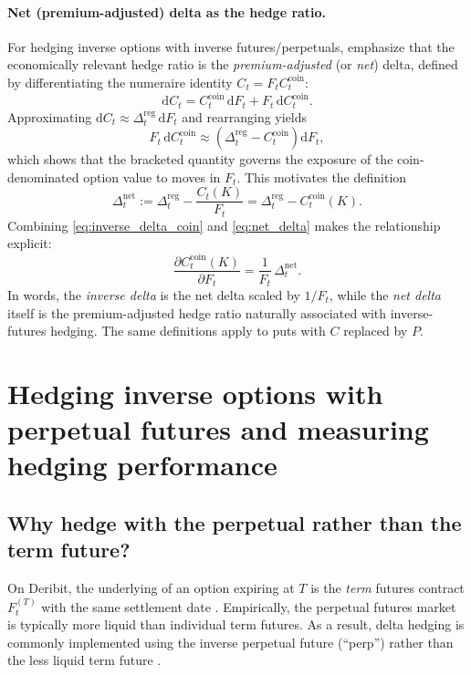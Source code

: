 \documentclass[a4paper,titlepage,12pt]{report}
\theoremstyle{plain}
\begin{document}
\paragraph{Net (premium-adjusted) delta as the hedge ratio.}
For hedging inverse options with inverse futures/perpetuals, \citet{LucicSepp2024} emphasize that the
economically relevant hedge ratio is the \emph{premium-adjusted} (or \emph{net}) delta, defined by
differentiating the numeraire identity $C_t = F_t C_t^{\mathrm{coin}}$:
\[
\mathrm{d}C_t
=
C_t^{\mathrm{coin}}\,\mathrm{d}F_t
+
F_t\,\mathrm{d}C_t^{\mathrm{coin}}.
\]
Approximating $\mathrm{d}C_t \approx \Delta_t^{\mathrm{reg}}\,\mathrm{d}F_t$ and rearranging yields
\[
F_t\,\mathrm{d}C_t^{\mathrm{coin}}
\approx
\left(\Delta_t^{\mathrm{reg}}-C_t^{\mathrm{coin}}\right)\mathrm{d}F_t,
\]
which shows that the bracketed quantity governs the exposure of the coin-denominated option value to
moves in $F_t$. This motivates the definition
\begin{equation}
\boxed{
\Delta_t^{\mathrm{net}}
:=
\Delta_t^{\mathrm{reg}}-\frac{C_t(K)}{F_t}
=
\Delta_t^{\mathrm{reg}}-C_t^{\mathrm{coin}}(K).
}
\label{eq:net_delta}
\end{equation}
Combining \eqref{eq:inverse_delta_coin} and \eqref{eq:net_delta} makes the relationship explicit:
\begin{equation}
\frac{\partial C^{\mathrm{coin}}_t(K)}{\partial F_t}
=
\frac{1}{F_t}\,\Delta_t^{\mathrm{net}}.
\label{eq:inverse_delta_net_relation}
\end{equation}
In words, the \emph{inverse delta} is the net delta scaled by $1/F_t$, while the \emph{net delta}
itself is the premium-adjusted hedge ratio naturally associated with inverse-futures hedging.
The same definitions apply to puts with $C$ replaced by $P$.


\section{Hedging inverse options with perpetual futures and measuring hedging performance}
\label{sec:hedging_perp}

\subsection{Why hedge with the perpetual rather than the term future?}
\label{subsec:perp_liquidity}

On Deribit, the underlying of an option expiring at $T$ is the \emph{term} futures contract $F_t^{(T)}$ with the same settlement date \citep{LucicSepp2024}. Empirically, the perpetual futures market is typically more liquid than individual term futures. As a result, delta hedging is commonly implemented using the inverse perpetual future (``perp'') rather than the less liquid term future \citep{LucicSepp2024}.
\end{document}
